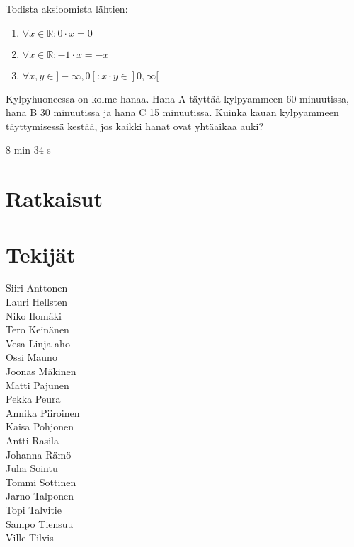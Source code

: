 \begin{tehtava}
Todista aksioomista lähtien:
\begin{enumerate}[(1)]
\item $\forall x \in \mathbb{R}: 0 \cdot x = 0$
\item $\forall x \in \mathbb{R}: -1 \cdot x = -x$
\item $\forall x, y \in ]-\infty,0[: x \cdot y \in ]0,\infty[$
\end{enumerate}
\begin{vastaus}
\begin{enumerate}[(1)]
\end{enumerate}
\end{vastaus}
\end{tehtava}

\begin{tehtava}
Kylpyhuoneessa on kolme hanaa. Hana A täyttää kylpyammeen 60 minuutissa, hana B 30 minuutissa ja hana C 15 minuutissa. Kuinka kauan kylpyammeen täyttymisessä kestää, jos kaikki hanat ovat yhtäaikaa auki?
\begin{vastaus}
$8$ min $34$ s
\end{vastaus}
\end{tehtava}

\chapter{Ratkaisut}


\chapter{Tekijät}

Siiri Anttonen \\
Lauri Hellsten\\
Niko Ilomäki\\
Tero Keinänen\\
Vesa Linja-aho\\
Ossi Mauno\\
Joonas Mäkinen\\
Matti Pajunen\\
Pekka Peura\\
Annika Piiroinen\\
Kaisa Pohjonen\\
Antti Rasila\\
Johanna Rämö\\
Juha Sointu\\
Tommi Sottinen\\
Jarno Talponen\\
Topi Talvitie\\
Sampo Tiensuu\\
Ville Tilvis

